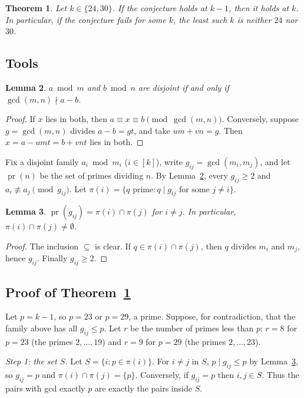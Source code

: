 \documentclass[11pt]{article}
\newtheorem{theorem}{Theorem}
\newtheorem{lemma}[theorem]{Lemma}
\theoremstyle{definition}
\theoremstyle{remark}
\newcommand{\pr}{\operatorname{pr}}
\begin{document}
\begin{theorem}\label{thm:min}
Let $k\in\{24,30\}$. If the conjecture holds at $k-1$, then it holds at $k$. In particular, if
the conjecture fails for some $k$, the least such $k$ is neither $24$ nor $30$.
\end{theorem}

\subsection*{Tools}

\begin{lemma}\label{lem:crt}
$a\bmod m$ and $b\bmod n$ are disjoint if and only if $\gcd(m,n)\nmid a-b$.
\end{lemma}
\begin{proof}
If $x$ lies in both, then $a\equiv x\equiv b\pmod{\gcd(m,n)}$. Conversely, suppose $g=\gcd(m,n)$
divides $a-b=gt$, and take $um+vn=g$. Then $x=a-umt=b+vnt$ lies in both.
\end{proof}

Fix a disjoint family $a_i\bmod m_i$ ($i\in[k]$), write $g_{ij}=\gcd(m_i,m_j)$, and let $\pr(n)$ be
the set of primes dividing $n$. By Lemma~\ref{lem:crt}, every $g_{ij}\ge2$ and
$a_i\not\equiv a_j\pmod{g_{ij}}$. Let $\pi(i)=\{q\text{ prime}: q\mid g_{ij}\text{ for some }j\ne i\}$.

\begin{lemma}\label{lem:channel}
$\pr(g_{ij})=\pi(i)\cap\pi(j)$ for $i\ne j$. In particular, $\pi(i)\cap\pi(j)\neq\emptyset$.
\end{lemma}
\begin{proof}
The inclusion $\subseteq$ is clear. If $q\in\pi(i)\cap\pi(j)$, then $q$ divides $m_i$ and $m_j$, hence
$g_{ij}$. Finally $g_{ij}\ge2$.
\end{proof}

\subsection*{Proof of Theorem~\ref{thm:min}}

Let $p=k-1$, so $p=23$ or $p=29$, a prime. Suppose, for contradiction, that the family above
has all $g_{ij}\le p$. Let $r$ be the number of primes less than $p$: $r=8$ for $p=23$ (the primes
$2,\dots,19$) and $r=9$ for $p=29$ (the primes $2,\dots,23$).

\emph{Step 1: the set $S$.} Let $S=\{i: p\in\pi(i)\}$. For $i\ne j$ in $S$, $p\mid g_{ij}\le p$ by
Lemma~\ref{lem:channel}, so $g_{ij}=p$ and $\pi(i)\cap\pi(j)=\{p\}$. Conversely, if $g_{ij}=p$
then $i,j\in S$. Thus the pairs with gcd exactly $p$ are exactly the pairs inside $S$.
\end{document}
